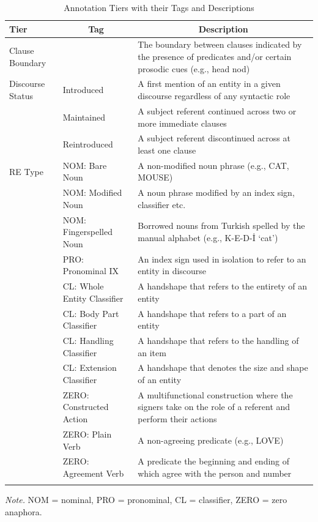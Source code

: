 \documentclass[]{elsarticle} %
\begin{document}
\begin{table}[p]

\begin{center}
\begin{threeparttable}

\caption{\label{tab:tab-2}Annotation Tiers with their Tags and Descriptions}

\footnotesize{

\begin{tabular}{p{3.2cm}p{3.8cm}p{3.8cm}}
\toprule
Tier & \multicolumn{1}{c}{Tag} & \multicolumn{1}{c}{Description}\\
\midrule
Clause Boundary &  & The boundary between clauses indicated by the presence of predicates and/or certain prosodic cues (e.g., head nod)\\
Discourse Status & Introduced & A first mention of an entity in a given discourse regardless of any syntactic role\\
 & Maintained & A subject referent continued across two or more immediate clauses\\
 & Reintroduced & A subject referent discontinued across at least one clause\\
RE Type & NOM: Bare Noun & A non-modified noun phrase (e.g., CAT, MOUSE)\\
 & NOM: Modified Noun & A noun phrase modified by an index sign, classifier etc.\\
 & NOM: Fingerspelled Noun & Borrowed nouns from Turkish spelled by the manual alphabet (e.g., K-E-D-İ ‘cat’)\\
 & PRO: Pronominal IX & An index sign used in isolation to refer to an entity in discourse\\
 & CL: Whole Entity Classifier & A handshape that refers to the entirety of an entity\\
 & CL: Body Part Classifier & A handshape that refers to a part of an entity\\
 & CL: Handling Classifier & A handshape that refers to the handling of an item\\
 & CL: Extension Classifier & A handshape that denotes the size and shape of an entity\\
 & ZERO: Constructed Action & A multifunctional construction where the signers take on the role of a referent and perform their actions\\
 & ZERO: Plain Verb & A non-agreeing predicate (e.g., LOVE)\\
 & ZERO: Agreement Verb & A predicate the beginning and ending of which agree with the person and number\\
\bottomrule
\addlinespace
\end{tabular}

}

\begin{tablenotes}[para]
\normalsize{\textit{Note.} NOM = nominal, PRO = pronominal, CL = classifier, ZERO = zero anaphora.}
\end{tablenotes}

\end{threeparttable}
\end{center}

\end{table}
\end{document}
